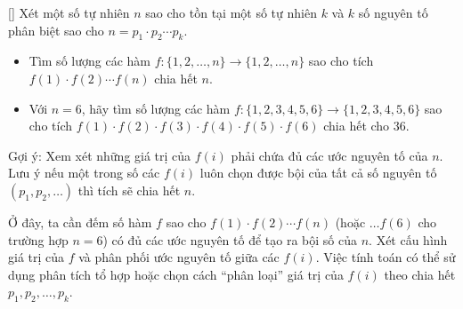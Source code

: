 \documentclass[../01-divisibility.tex]{subfiles}
\begin{document}
\begin{exercise*}\label{example:ROU-2015-MO-G10-P2}[\textbf{}]
    Xét một số tự nhiên \( n \) sao cho tồn tại một số tự nhiên \( k \) và \( k \) số nguyên tố phân biệt sao cho \( n = p_1 \cdot p_2 \cdots p_k \).
    \begin{itemize}[topsep=0pt, partopsep=0pt, itemsep=0pt]
        \item Tìm số lượng các hàm \( f : \{1, 2, \ldots, n\} \longrightarrow \{1, 2, \ldots, n\} \) sao cho tích \( f(1) \cdot f(2) \cdots f(n) \) chia hết \( n \).
        \item Với \( n = 6 \), hãy tìm số lượng các hàm \( f : \{1, 2, 3, 4, 5, 6\} \longrightarrow \{1, 2, 3, 4, 5, 6\} \)
        sao cho tích \( f(1)\cdot f(2)\cdot f(3)\cdot f(4)\cdot f(5)\cdot f(6) \) chia hết cho \( 36 \).
    \end{itemize}

    \begin{remark*}
        Gợi ý: Xem xét những giá trị của \(f(i)\) phải chứa đủ các ước nguyên tố của \(n\).
        Lưu ý nếu một trong số các \(f(i)\) luôn chọn được bội của tất cả số nguyên tố \((p_1, p_2, \dots)\) thì tích sẽ chia hết \(n\).
    \end{remark*}

    \begin{story*}
        Ở đây, ta cần đếm số hàm \(f\) sao cho \(f(1)\cdot f(2)\cdots f(n)\) (hoặc \(\dots f(6)\) cho trường hợp \(n=6\)) có đủ các ước nguyên tố
        để tạo ra bội số của \(n\). Xét cấu hình giá trị của \(f\) và phân phối ước nguyên tố giữa các \(f(i)\).
        Việc tính toán có thể sử dụng phân tích tổ hợp hoặc chọn cách “phân loại” giá trị của \(f(i)\) theo chia hết \(p_1, p_2, \dots, p_k\).
    \end{story*}
\end{exercise*}
\end{document}
